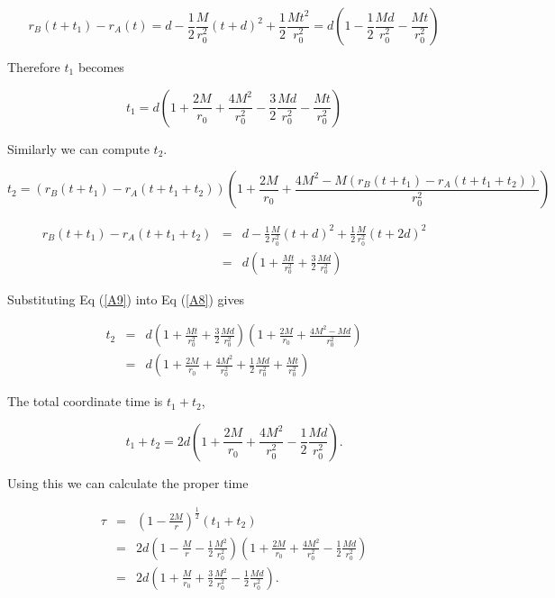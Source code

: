 \documentclass[aps,showpacs,onecolumn,floats,prd,superscriptaddress,nofootinbib]{revtex4-1}
\begin{document}
\begin{equation}
	r_B(t + t_1) - r_A(t) = d - \frac{1}{2} \frac{M}{r_0^2}(t + d)^2 + \frac{1}{2} \frac{Mt^2}{r_0^2} = d \left( 1 - \frac{1}{2} \frac{Md}{r_0^2} - \frac{Mt}{r_0^2} \right)
\end{equation}

Therefore $t_1$ becomes

\begin{equation}
	t_1 = d \left( 1 + \frac{2M}{r_0} + \frac{4M^2}{r_0^2} - \frac{3}{2} \frac{Md}{r_0^2} - \frac{Mt}{r_0^2} \right)
\end{equation}

Similarly we can compute $t_2$.

\begin{equation}
	t_2 = (r_B(t + t_1) - r_A(t+t_1 +t_2)) \left( 1 + \frac{2M}{r_0} + \frac{4M^2 - M (r_B(t + t_1) - r_A(t+t_1+t_2))}{r_0^2} \right)	\label{A8}
\end{equation}

\begin{eqnarray}
	r_B(t + t_1) - r_A(t + t_1 + t_2) & = & d - \frac{1}{2} \frac{M}{r_0^2} (t + d)^2 + \frac{1}{2} \frac{M}{r_0^2} (t + 2d)^2	\nonumber	\\
	& = & d \left( 1 + \frac{Mt}{r_0^2} + \frac{3}{2} \frac{Md}{r_0^2} \right) 	\label{A9}
\end{eqnarray}

Substituting Eq (\ref{A9}) into Eq (\ref{A8}) gives 

\begin{eqnarray}
	t_2 & = & d \left( 1 + \frac{Mt}{r_0^2} + \frac{3}{2} \frac{Md}{r_0^2} \right) \left( 1 + \frac{2M}{r_0} + \frac{4M^2 - Md}{r_0^2} \right)\nonumber	\\
	& = & d \left( 1 + \frac{2M}{r_0} + \frac{4M^2}{r_0^2} + \frac{1}{2} \frac{Md}{r_0^2} + \frac{Mt}{r_0^2} \right)
\end{eqnarray}

The total coordinate time is $t_1 + t_2$,

\begin{equation}
	t_1 +t_2 = 2d \left(1 + \frac{2M}{r_0} + \frac{4M^2}{r_0^2} - \frac{1}{2} \frac{Md}{r_0^2}\right).
\end{equation}

Using this we can calculate the proper time

\begin{eqnarray}
	\tau & = &  \left( 1 - \frac{2M}{r} \right)^\frac{1}{2} (t_1 + t_2) 	\nonumber	\\
	& = & 2d \left( 1 - \frac{M}{r} - \frac{1}{2} \frac{M^2}{r_0^2} \right) \left( 1 + \frac{2M}{r_0} + \frac{4M^2}{r_0^2} - \frac{1}{2} \frac{Md}{r_0^2} \right)		\nonumber	\\
	&  = & 2d \left( 1  + \frac{M}{r_0} + \frac{3}{2} \frac{M^2}{r_0^2} - \frac{1}{2} \frac{Md}{r_0^2} \right).	\label{tauini}
\end{eqnarray}




\end{document}
